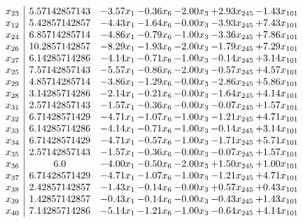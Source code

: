\documentclass[8pt]{article}
\begin{document}
\[\begin{array}{c| c c@{\hskip 2pt} c@{\hskip 2pt} c@{\hskip 2pt} c@{\hskip 2pt} c@{\hskip 2pt} }
 x_{23}   &  5.57142857143 & -3.57 x_{1} & -0.36 x_{6} & -2.00 x_{3} & +  2.93 x_{245} & -1.43 x_{101}\\
 x_{12}   &  5.42857142857 & -4.43 x_{1} & -1.64 x_{6} & -0.00 x_{3} & -3.93 x_{245} & +  7.43 x_{101}\\
 x_{24}   &  6.85714285714 & -4.86 x_{1} & -0.79 x_{6} & -1.00 x_{3} & -3.36 x_{245} & +  7.86 x_{101}\\
 x_{26}   &  10.2857142857 & -8.29 x_{1} & -1.93 x_{6} & -2.00 x_{3} & -1.79 x_{245} & +  7.29 x_{101}\\
 x_{27}   &  6.14285714286 & -4.14 x_{1} & -0.71 x_{6} & -1.00 x_{3} & -0.14 x_{245} & +  3.14 x_{101}\\
 x_{25}   &  7.57142857143 & -5.57 x_{1} & -0.86 x_{6} & -2.00 x_{3} & -0.57 x_{245} & +  4.57 x_{101}\\
 x_{29}   &  4.85714285714 & -3.86 x_{1} & -1.29 x_{6} & -0.00 x_{3} & -2.86 x_{245} & +  5.86 x_{101}\\
 x_{28}   &  3.14285714286 & -2.14 x_{1} & -0.21 x_{6} & -0.00 x_{3} & -1.64 x_{245} & +  4.14 x_{101}\\
 x_{31}   &  2.57142857143 & -1.57 x_{1} & -0.36 x_{6} & -0.00 x_{3} & -0.07 x_{245} & +  1.57 x_{101}\\
 x_{32}   &  6.71428571429 & -4.71 x_{1} & -1.07 x_{6} & -1.00 x_{3} & -1.21 x_{245} & +  4.71 x_{101}\\
 x_{33}   &  6.14285714286 & -4.14 x_{1} & -0.71 x_{6} & -1.00 x_{3} & -0.14 x_{245} & +  3.14 x_{101}\\
 x_{34}   &  6.71428571429 & -4.71 x_{1} & -0.57 x_{6} & -1.00 x_{3} & -1.71 x_{245} & +  5.71 x_{101}\\
 x_{35}   &  2.57142857143 & -1.57 x_{1} & -0.36 x_{6} & -0.00 x_{3} & -0.07 x_{245} & +  1.57 x_{101}\\
 x_{36}   &  6.0 & -4.00 x_{1} & -0.50 x_{6} & -2.00 x_{3} & +  1.50 x_{245} & +  1.00 x_{101}\\
 x_{37}   &  6.71428571429 & -4.71 x_{1} & -1.07 x_{6} & -1.00 x_{3} & -1.21 x_{245} & +  4.71 x_{101}\\
 x_{38}   &  2.42857142857 & -1.43 x_{1} & -0.14 x_{6} & -0.00 x_{3} & +  0.57 x_{245} & +  0.43 x_{101}\\
 x_{39}   &  1.42857142857 & -0.43 x_{1} & -0.14 x_{6} & -0.00 x_{3} & -0.43 x_{245} & +  1.43 x_{101}\\
 x_{40}   &  7.14285714286 & -5.14 x_{1} & -1.21 x_{6} & -1.00 x_{3} & -0.64 x_{245} & +  4.14 x_{101}\\

\end{array}\]
\end{document}
